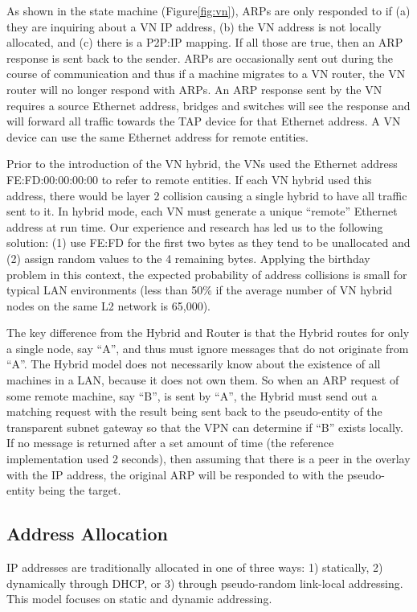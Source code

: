 As shown in the state machine (Figure\ref{fig:vn}), ARPs are only responded to
if (a) they are inquiring about a VN IP address, (b) the VN address is not
locally allocated, and (c) there is a P2P:IP mapping.  If all those are true,
then an ARP response is sent back to the sender.  ARPs are occasionally sent
out during the course of communication and thus if a machine migrates to a VN
router, the VN router will no longer respond with ARPs.  An ARP response sent
by the VN requires a source Ethernet address, bridges and switches will see the
response and will forward all traffic towards the TAP device for that Ethernet
address.  A VN device can use the same Ethernet address for remote entities.

Prior to the introduction of the VN hybrid, the VNs used the Ethernet address
FE:FD:00:00:00:00 to refer to remote entities.  If each VN hybrid used this
address, there would be layer 2 collision causing a single hybrid to have all
traffic sent to it.  In hybrid mode, each VN must generate a unique ``remote''
Ethernet address at run time.  Our experience and research has led us to the
following solution: (1) use FE:FD for the first two bytes as they tend to be
unallocated and (2) assign random values to the 4 remaining bytes.   Applying
the birthday problem in this context, the expected probability of address
collisions is small for typical LAN environments (less than 50\% if the average
number of VN hybrid nodes on the same L2 network is 65,000). 

The key difference from the Hybrid and Router is that the Hybrid routes for only
a single node, say ``A'', and thus must ignore messages that do not originate
from ``A''.  The Hybrid model does not necessarily know about the existence of
all machines in a LAN, because it does not own them.  So when an ARP request
of some remote machine, say ``B'', is sent by ``A'', the Hybrid must send out
a matching request with the result being sent back to the pseudo-entity of the
transparent subnet gateway so that the VPN can determine if ``B'' exists
locally.  If no message is returned after a set amount of time (the reference
implementation used 2 seconds), then assuming that there is a peer in the
overlay with the IP address, the original ARP will be responded to with the
pseudo-entity being the target.

\subsection{Address Allocation}
IP addresses are traditionally allocated in one of three ways: 1) statically, 2)
dynamically through DHCP, or 3) through pseudo-random link-local addressing.
This model focuses on static and dynamic addressing.


